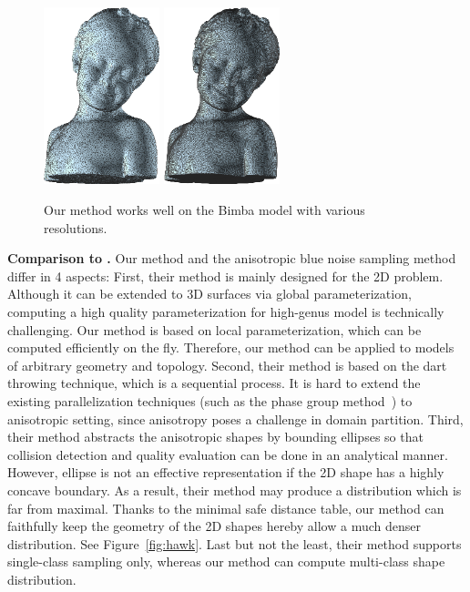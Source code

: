 \begin{figure}
  \includegraphics[width=0.3\textwidth]{figs/asd/bimba_nf30k_wireframe.png}
  \includegraphics[width=0.3\textwidth]{figs/asd/bimba_nf149k_wireframe.png}\\
  \caption{Our method works well on the Bimba model with various resolutions. }
  \label{fig:bimba_robust}
  \end{figure}


  \noindent\textbf{Comparison to \cite{li:anisotropic:2010}.} Our method and the anisotropic blue noise sampling method~\cite{li:anisotropic:2010} differ in 4 aspects:
  First, their method is mainly designed for the 2D problem.
  Although it can be extended to 3D surfaces via global parameterization, computing a high quality parameterization for high-genus model is technically challenging.
  Our method is based on local parameterization, which can be computed efficiently on the fly.
  Therefore, our method can be applied to models of arbitrary geometry and topology.
  Second, their method is based on the dart throwing technique, which is a sequential process.
  It is hard to extend the existing parallelization techniques (such as the phase group method~\cite{Wei:2008:PPD:1399504.1360619}) to anisotropic setting,
  since anisotropy poses a challenge in domain partition.
  Third, their method abstracts the anisotropic shapes by bounding ellipses so that collision detection and quality evaluation can be done in an analytical manner.
  However, ellipse is not an effective representation if the 2D shape has a highly concave boundary.
  As a result, their method may produce a distribution which is far from maximal.
  Thanks to the minimal safe distance table, our method can faithfully keep the geometry of the 2D shapes hereby allow a much denser distribution.
  See Figure~\ref{fig:hawk}.
  Last but not the least, their method supports single-class sampling only, whereas our method can compute multi-class shape distribution.

